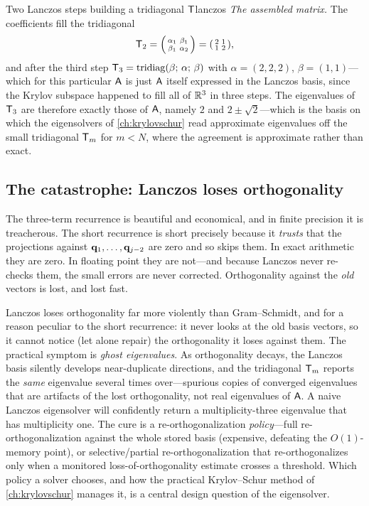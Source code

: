 \begin{workedexample}{Two Lanczos steps building a tridiagonal $\mathsf{T}$}{lanczos}
\emph{The assembled matrix.} The coefficients fill the tridiagonal
\[
  \mathsf{T}_2 = \begin{psmallmatrix} \alpha_1 & \beta_1 \\ \beta_1 & \alpha_2 \end{psmallmatrix}
            = \begin{psmallmatrix} 2 & 1 \\ 1 & 2 \end{psmallmatrix},
\]
and after the third step $\mathsf{T}_3 = \mathrm{tridiag}(\beta;\,\alpha;\,\beta)$ with
$\alpha = (2,2,2)$, $\beta = (1,1)$---which for this particular $\mathsf{A}$ is just
$\mathsf{A}$ itself expressed in the Lanczos basis, since the Krylov subspace happened to
fill all of $\mathbb{R}^3$ in three steps. The eigenvalues of $\mathsf{T}_3$ are therefore
exactly those of $\mathsf{A}$, namely $2$ and $2\pm\sqrt2$---which is the basis on which
the eigensolvers of \cref{ch:krylovschur} read approximate eigenvalues off the small
tridiagonal $\mathsf{T}_m$ for $m < N$, where the agreement is approximate rather than
exact.
\end{workedexample}

\subsection{The catastrophe: Lanczos loses orthogonality}

The three-term recurrence is beautiful and economical, and in finite precision it is
treacherous. The short recurrence is short precisely because it \emph{trusts} that
the projections against $\mathbf{q}_1,\dots,\mathbf{q}_{j-2}$ are zero and so skips them. In exact
arithmetic they are zero. In floating point they are not---and because Lanczos never
re-checks them, the small errors are never corrected. Orthogonality against the
\emph{old} vectors is lost, and lost fast.

\begin{pitfall}
Lanczos loses orthogonality far more violently than Gram--Schmidt, and for a reason
peculiar to the short recurrence: it never looks at the old basis vectors, so it
cannot notice (let alone repair) the orthogonality it loses against them. The
practical symptom is \emph{ghost eigenvalues}. As orthogonality decays, the Lanczos
basis silently develops near-duplicate directions, and the tridiagonal $\mathsf{T}_m$
reports the \emph{same} eigenvalue several times over---spurious copies of converged
eigenvalues that are artifacts of the lost orthogonality, not real eigenvalues of
$\mathsf{A}$. A naive Lanczos eigensolver will confidently return a multiplicity-three
eigenvalue that has multiplicity one. The cure is a re-orthogonalization
\emph{policy}---full re-orthogonalization against the whole stored basis (expensive,
defeating the $O(1)$-memory point), or selective/partial re-orthogonalization that
re-orthogonalizes only when a monitored loss-of-orthogonality estimate crosses a
threshold. Which policy a solver chooses, and how the practical Krylov--Schur method
of \cref{ch:krylovschur} manages it, is a central design question of the eigensolver.
\end{pitfall}


